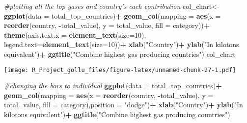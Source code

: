 \documentclass[
]{article}
\newenvironment{Shaded}{\begin{snugshade}}{\end{snugshade}}
\newcommand{\CommentTok}[1]{\textcolor[rgb]{0.56,0.35,0.01}{\textit{#1}}}
\newcommand{\DataTypeTok}[1]{\textcolor[rgb]{0.13,0.29,0.53}{#1}}
\newcommand{\DecValTok}[1]{\textcolor[rgb]{0.00,0.00,0.81}{#1}}
\newcommand{\KeywordTok}[1]{\textcolor[rgb]{0.13,0.29,0.53}{\textbf{#1}}}
\newcommand{\NormalTok}[1]{#1}
\newcommand{\OperatorTok}[1]{\textcolor[rgb]{0.81,0.36,0.00}{\textbf{#1}}}
\newcommand{\StringTok}[1]{\textcolor[rgb]{0.31,0.60,0.02}{#1}}
\begin{document}
\begin{Shaded}
\begin{Highlighting}[]
\CommentTok{#plotting all the top gases and country's each contribution}
\NormalTok{col_chart<-}\StringTok{ }\KeywordTok{ggplot}\NormalTok{(}\DataTypeTok{data =}\NormalTok{ total_top_countries)}\OperatorTok{+}
\StringTok{  }\KeywordTok{geom_col}\NormalTok{(}\DataTypeTok{mapping =} \KeywordTok{aes}\NormalTok{(}\DataTypeTok{x =} \KeywordTok{reorder}\NormalTok{(country, }\OperatorTok{-}\NormalTok{total_value), }\DataTypeTok{y =}\NormalTok{ total_value, }\DataTypeTok{fill =}\NormalTok{ category))}\OperatorTok{+}
\StringTok{  }\KeywordTok{theme}\NormalTok{(}\DataTypeTok{axis.text.x =} \KeywordTok{element_text}\NormalTok{(}\DataTypeTok{size=}\DecValTok{10}\NormalTok{),}
        \DataTypeTok{legend.text=}\KeywordTok{element_text}\NormalTok{(}\DataTypeTok{size=}\DecValTok{10}\NormalTok{))}\OperatorTok{+}
\StringTok{  }\KeywordTok{xlab}\NormalTok{(}\StringTok{"Country"}\NormalTok{)}\OperatorTok{+}
\StringTok{  }\KeywordTok{ylab}\NormalTok{(}\StringTok{"In kilotons equivalent"}\NormalTok{)}\OperatorTok{+}
\StringTok{  }\KeywordTok{ggtitle}\NormalTok{(}\StringTok{"Combine highest gas producing countries"}\NormalTok{)}
\NormalTok{col_chart}
\end{Highlighting}
\end{Shaded}

\texttt{[image: R\_Project\_gollu\_files/figure-latex/unnamed-chunk-27-1.pdf]}

\begin{Shaded}
\begin{Highlighting}[]
\CommentTok{#changing the bars to individual}
\KeywordTok{ggplot}\NormalTok{(}\DataTypeTok{data =}\NormalTok{ total_top_countries)}\OperatorTok{+}
\StringTok{  }\KeywordTok{geom_col}\NormalTok{(}\DataTypeTok{mapping =} \KeywordTok{aes}\NormalTok{(}\DataTypeTok{x =} \KeywordTok{reorder}\NormalTok{(country, }\OperatorTok{-}\NormalTok{total_value), }\DataTypeTok{y =}\NormalTok{ total_value, }\DataTypeTok{fill =}\NormalTok{ category),}\DataTypeTok{position =} \StringTok{"dodge"}\NormalTok{)}\OperatorTok{+}
\StringTok{  }\KeywordTok{xlab}\NormalTok{(}\StringTok{"Country"}\NormalTok{)}\OperatorTok{+}
\StringTok{  }\KeywordTok{ylab}\NormalTok{(}\StringTok{"In kilotons equivalent"}\NormalTok{)}\OperatorTok{+}
\StringTok{  }\KeywordTok{ggtitle}\NormalTok{(}\StringTok{"Combine highest gas producing countries"}\NormalTok{)}
\end{Highlighting}
\end{Shaded}
\end{document}
